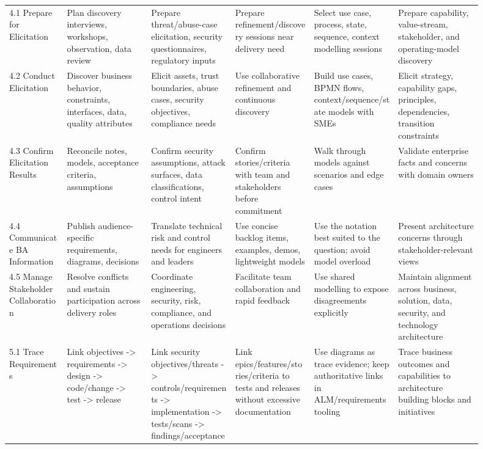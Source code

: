 \documentclass[11pt]{article}
\begin{document}
\begin{landscape}
\begin{longtable}{L{0.11\linewidth} L{0.16\linewidth} L{0.16\linewidth} L{0.15\linewidth} L{0.16\linewidth} L{0.16\linewidth}}
4.1 Prepare for Elicitation & Plan discovery interviews, workshops, observation, data review & Prepare threat/abuse-case elicitation, security questionnaires, regulatory inputs & Prepare refinement/discovery sessions near delivery need & Select use case, process, state, sequence, context modelling sessions & Prepare capability, value-stream, stakeholder, and operating-model discovery\\
4.2 Conduct Elicitation & Discover business behavior, constraints, interfaces, data, quality attributes & Elicit assets, trust boundaries, abuse cases, security objectives, compliance needs & Use collaborative refinement and continuous discovery & Build use cases, BPMN flows, context/sequence/state models with SMEs & Elicit strategy, capability gaps, principles, dependencies, transition constraints\\
4.3 Confirm Elicitation Results & Reconcile notes, models, acceptance criteria, assumptions & Confirm security assumptions, attack surfaces, data classifications, control intent & Confirm stories/criteria with team and stakeholders before commitment & Walk through models against scenarios and edge cases & Validate enterprise facts and concerns with domain owners\\
4.4 Communicate BA Information & Publish audience-specific requirements, diagrams, decisions & Translate technical risk and control needs for engineers and leaders & Use concise backlog items, examples, demos, lightweight models & Use the notation best suited to the question; avoid model overload & Present architecture concerns through stakeholder-relevant views\\
4.5 Manage Stakeholder Collaboration & Resolve conflicts and sustain participation across delivery roles & Coordinate engineering, security, risk, compliance, and operations decisions & Facilitate team collaboration and rapid feedback & Use shared modelling to expose disagreements explicitly & Maintain alignment across business, solution, data, security, and technology architecture\\
5.1 Trace Requirements & Link objectives -> requirements -> design -> code/change -> test -> release & Link security objectives/threats -> controls/requirements -> implementation -> tests/scans -> findings/acceptance & Link epics/features/stories/criteria to tests and releases without excessive documentation & Use diagrams as trace evidence; keep authoritative links in ALM/requirements tooling & Trace business outcomes and capabilities to architecture building blocks and initiatives\\

\end{longtable}
\end{landscape}
\end{document}
